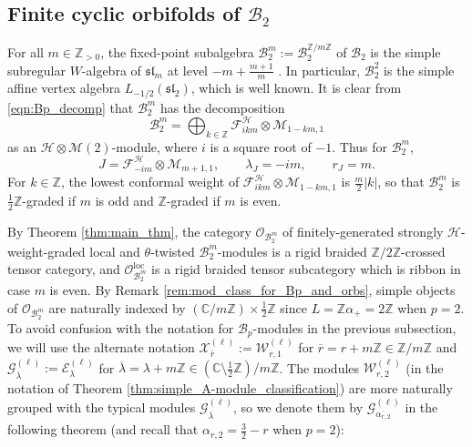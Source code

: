\documentclass[11pt, reqno]{amsart}
\theoremstyle{definition}\newtheorem{defi}[thm]{Definition}
\theoremstyle{definition}\newtheorem{rem}[thm]{Remark}
\theoremstyle{definition}\newtheorem{exam}[thm]{Example}
\theoremstyle{definition}\newtheorem{assum}[thm]{Assumption}
\newcommand{\cB}{\mathcal{B}}
\newcommand{\cE}{\mathcal{E}}
\newcommand{\cH}{\mathcal{H}}
\newcommand{\cM}{\mathcal{M}}
\newcommand{\cX}{\mathcal{X}}
\newcommand{\cF}{\mathcal{F}}
\newcommand{\cO}{\mathcal{O}}
\newcommand{\cG}{\mathcal{G}}
\newcommand{\cW}{\mathcal{W}}
\newcommand{\CC}{\mathbb{C}}
\newcommand{\ZZ}{\mathbb{Z}}
\newcommand{\Oloc}{\cO^{\mathrm{loc}}}
\begin{document}
\subsection{Finite cyclic orbifolds of \texorpdfstring{$\cB_2$}{B2}}

For all $m\in\ZZ_{>0}$, the fixed-point subalgebra $\cB_2^m:=\cB_2^{\ZZ/m\ZZ}$ of $\cB_2$ is the simple subregular $W$-algebra of $\mathfrak{sl}_m$ at level $-m+\frac{m+1}{m}$ \cite[Theorem 9.4]{CL-trialities}. In particular, $\cB_2^{2}$ is the simple affine vertex algebra $L_{-1/2}(\mathfrak{sl}_2)$, which is well known. It is clear from \eqref{eqn:Bp_decomp} that $\cB_2^{m}$ has the decomposition
\begin{equation*}
\cB_2^{m} =\bigoplus_{k\in\ZZ} \cF^\cH_{ikm}\otimes\cM_{1-km,1}
\end{equation*}
as an $\cH\otimes\cM(2)$-module, where $i$ is a square root of $-1$. Thus for $\cB_2^m$, 
\begin{equation*}
J=\cF^\cH_{-im}\otimes\cM_{m+1,1},\qquad\lambda_J=-im,\qquad r_J=m.
\end{equation*}
For $k\in\ZZ$, the lowest conformal weight of $\cF^\cH_{ikm}\otimes\cM_{1-km,1}$ is $\frac{m}{2}\vert k\vert$, so that $\cB_2^m$ is $\frac{1}{2}\ZZ$-graded if $m$ is odd and $\ZZ$-graded if $m$ is even. 





By Theorem \ref{thm:main_thm}, the category $\cO_{\cB_2^m}$ of finitely-generated strongly $\cH$-weight-graded local and $\theta$-twisted $\cB_2^m$-modules is a rigid braided $\ZZ/2\ZZ$-crossed tensor category, and $\Oloc_{\cB_2^m}$ is a rigid braided tensor subcategory which is ribbon in case $m$ is even. By Remark \ref{rem:mod_class_for_Bp_and_orbs}, simple objects of $\cO_{\cB_2^m}$ are naturally indexed by $(\CC/m\ZZ)\times\frac{1}{2}\ZZ$ since $L=\ZZ\alpha_+=2\ZZ$ when $p=2$. To avoid confusion with the notation for $\cB_p$-modules in the previous subsection, we will use the alternate notation $\cX_{\overline{r}}^{(\ell)}:=\cW_{r,1}^{(\ell)}$ for $\overline{r}=r+m\ZZ\in\ZZ/m\ZZ$ and $\cG_{\overline{\lambda}}^{(\ell)}:=\cE_{\lambda}^{(\ell)}$ for $\overline{\lambda}=\lambda+m\ZZ\in(\CC\setminus\frac{1}{2}\ZZ)/m\ZZ$. The modules $\cW_{r,2}^{(\ell)}$ (in the notation of Theorem \ref{thm:simple_A-module_classification}) are more naturally grouped with the typical modules $\cG^{(\ell)}_{\overline{\lambda}}$, so we denote them by $\cG^{(\ell)}_{\overline{\alpha_{r,2}}}$ in the following theorem (and recall that $\alpha_{r,2}=\frac{3}{2}-r$ when $p=2$):
\end{document}
